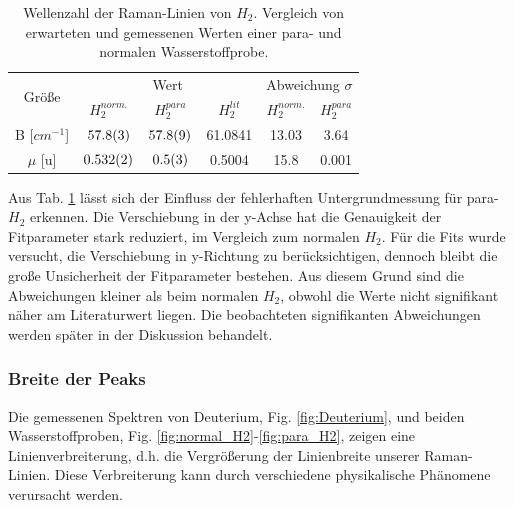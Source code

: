 \documentclass[11pt]{article}
\begin{document}
\begin{table}[!htbp]
 \begin{center}
  \caption{\small Wellenzahl der Raman-Linien von $H_2$. Vergleich von erwarteten und gemessenen Werten einer para- und normalen Wasserstoffprobe.}
  \label{tab:H2_B_mu}
  \renewcommand{\arraystretch}{1.3} %
  \begin{tabular}{|c|c|c|c|c|c|}
  \hline

\multirow{2}{*}{Größe}&\multicolumn{3}{c|}{Wert}& \multicolumn{2}{c|}{ Abweichung $\sigma$} \\ \cline{2-6} %
 					 &$H_2^{norm.}$	&	$H_2^{para}$ &  $H_2^{lit}$ &  $H_2^{norm.}$	&	$H_2^{para}$\\ 
  \hline
	\hline 
B [$\unit{cm^{-1}}$] & $\num{57.8\pm0.3}$ & $\num{57.8\pm0.9}$ & 61.0841 & 13.03 & 3.64 \\
$\mu$ [$\unit{\atomicmassunit}$] & $\num{0.532\pm0.002}$& $\num{0.5\pm0.3}$&0.5004 &15.8 & 0.001\\
	\hline
  \end{tabular}
  \renewcommand{\arraystretch}{1}
 \end{center}
\end{table}

Aus Tab. \ref{tab:H2_B_mu} lässt sich der Einfluss der fehlerhaften Untergrundmessung für para-$H_2$ erkennen. Die Verschiebung in der y-Achse hat die Genauigkeit der Fitparameter stark reduziert, im Vergleich zum normalen $H_2$. Für die Fits wurde versucht, die Verschiebung in y-Richtung zu berücksichtigen, dennoch bleibt die große Unsicherheit der Fitparameter bestehen. Aus diesem Grund sind die Abweichungen kleiner als beim normalen $H_2$, obwohl die Werte nicht signifikant näher am Literaturwert liegen. Die beobachteten signifikanten Abweichungen werden später in der Diskussion behandelt.

\subsubsection{Breite der Peaks}
Die gemessenen Spektren von Deuterium, Fig. \ref{fig:Deuterium}, und beiden Wasserstoffproben, Fig. \ref{fig:normal_H2}-\ref{fig:para_H2}, zeigen eine Linienverbreiterung, d.h. die Vergrößerung der Linienbreite unserer Raman-Linien. Diese Verbreiterung kann durch verschiedene physikalische Phänomene verursacht werden.
\end{document}
